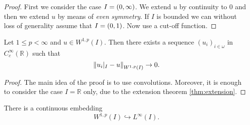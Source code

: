 \begin{proof}
	First we consider the case $I = \intoo{0,\infty}$. We extend $u$ by continuity to $0$ and then we extend $u$ by means of \emph{even symmetry}. If $I$ is bounded we can without loss of generality assume that $I = \intoo{0,1}$. Now use a cut-off function.
\end{proof}

\begin{theorem}
	Let $1 \leq p < \infty$ and $u \in W^{1,p}(I)$. Then there exists a sequence $(u_i)_{i \in \omega}$ in $C^\infty_c(\mathbb{R})$ such that
	\begin{equation*}
		\norm[0]{u_i\vert_I - u}_{W^{1,p}(I)} \to 0.
	\end{equation*}
\end{theorem}

\begin{proof}
	The main idea of the proof is to use convolutions. Moreover, it is enough to consider the case $I = \mathbb{R}$ only, due to the extension theorem \ref{thm:extension}. 	
\end{proof}

\begin{theorem}
	\label{thm:Sobolev_embedding}
	There is a continuous embedding 
	\begin{equation*}
			W^{1,p}(I) \hookrightarrow L^\infty(I).
	\end{equation*}
\end{theorem}

